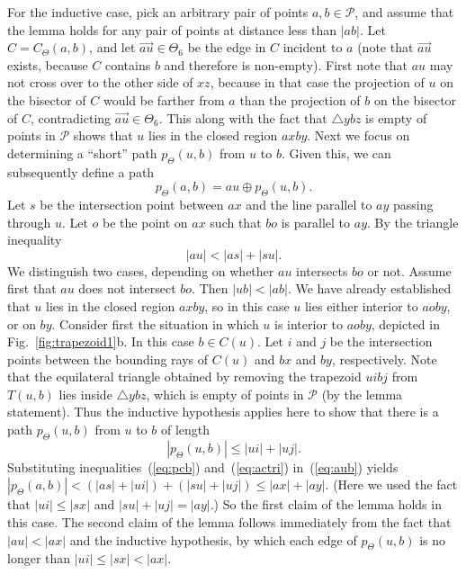 \documentclass[11pt]{article}
\newcommand\cone{{C}}
\newcommand\Pt{\mathcal P}
\newcommand{\arr}[1]{\overrightarrow{#1}}
\begin{document}
For the inductive case, pick an arbitrary pair of points $a, b \in \Pt$, and assume that the lemma holds for any pair of points at distance less than $|ab|$.
Let $\cone = \cone_\Theta(a, b)$, and let $\arr{au} \in \Theta_6$ be the edge in $\cone$ incident to $a$ (note that $\arr{au}$ exists, because $\cone$ contains $b$ and therefore is non-empty).
First note that $au$ may not cross over to the other side of $xz$, because in that case the projection of $u$ on the bisector of $\cone$ would be farther from $a$ than the projection of $b$ on the bisector of $\cone$, contradicting $\arr{au} \in \Theta_6$. This along with the fact that $\triangle ybz$ is empty of points in $\Pt$ shows that $u$ lies in the closed region $axby$. Next we focus on determining a ``short'' path $p_\Theta(u, b)$ from $u$ to $b$. Given this, we can subsequently define a path
\begin{equation}
p_\Theta(a, b) = au \oplus p_\Theta(u, b).
\label{eq:aub}
\end{equation}
Let $s$ be the intersection point between $ax$ and the line parallel to $ay$ passing through $u$. Let $o$ be the point on $ax$ such that $bo$ is parallel to $ay$. By the triangle inequality
\begin{equation}
|au| < |as| + |su|.
\label{eq:actri}
\end{equation}
We distinguish two cases, depending on whether $au$ intersects $bo$ or not.
Assume first that $au$ does not intersect $bo$. Then $|ub| < |ab|$. We have already established that $u$ lies in the closed region $axby$, so in this case $u$ lies either interior to $aoby$, or on $by$. Consider first the situation in which $u$ is interior to $aoby$, depicted in Fig.~\ref{fig:trapezoid1}b. In this case $b \in \cone(u)$. Let $i$ and $j$ be the intersection points between the bounding rays of $\cone(u)$ and $bx$ and $by$, respectively. Note that the equilateral triangle obtained by removing the trapezoid $uibj$ from $T(u, b)$ lies inside $\triangle ybz$, which is empty of points in $\Pt$ (by the lemma statement). Thus the inductive hypothesis applies here to show that there is a path $p_\Theta(u, b)$ from $u$ to $b$ of length
\begin{equation}
|p_\Theta(u, b)| \le |ui| +|uj|.
\label{eq:pcb}
\end{equation}
Substituting inequalities~(\ref{eq:pcb}) and~(\ref{eq:actri}) in~(\ref{eq:aub}) yields $|p_\Theta(a, b)| < (|as|+ |ui|) +(|su| + |uj|) \le |ax| + |ay|$. (Here we used the fact that $|ui| \le |sx|$ and $|su| + |uj| = |ay|$.) So the first claim of the lemma holds in this case. The second claim of the lemma follows immediately from the fact that $|au| < |ax|$ and the inductive hypothesis, by which each edge of $p_\Theta(u, b)$ is no longer than $|ui| \le |sx| < |ax|$.
\end{document}
